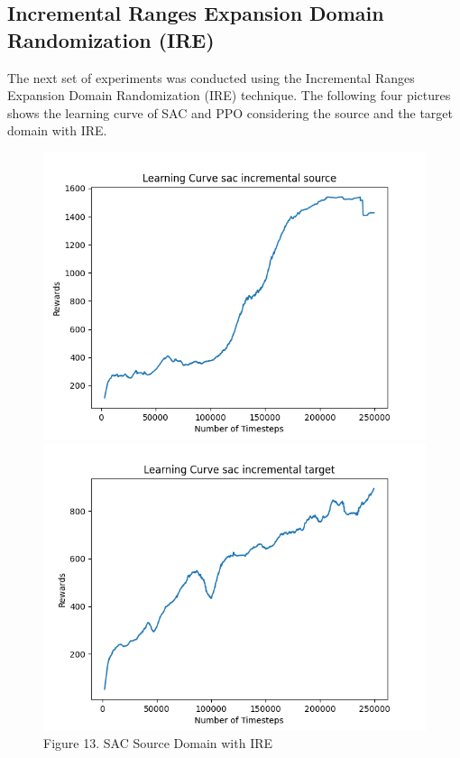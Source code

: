\documentclass[12pt]{article}
\begin{document}
\subsection{Incremental Ranges Expansion Domain Randomization (IRE)}

The next set of experiments was conducted using the Incremental Ranges Expansion Domain Randomization (IRE) technique. The following four pictures shows the learning curve of SAC and PPO considering the source and the target domain with IRE.

\begin{figure}[H]
    \centering
    \begin{minipage}{0.45\textwidth}
        \centering
        \includegraphics[width=\textwidth]{../images/Learning_Curve_SAC_Incremental_Source.png}
        \caption{Figure 13. SAC Source Domain with IRE}
        \label{fig:sac_source_ire}
    \end{minipage}
    \hfill
    \begin{minipage}{0.45\textwidth}
        \centering
        \includegraphics[width=\textwidth]{../images/Learning_Curve_SAC_Incremental_Target.png}

\end{minipage}
\end{figure}
\end{document}
